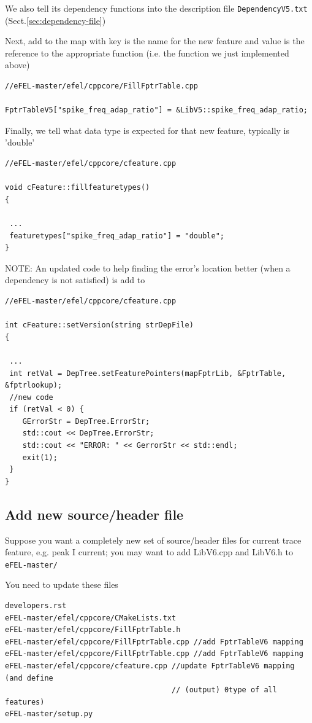 We also tell its dependency functions into the description file
\verb!DependencyV5.txt! (Sect.\ref{sec:dependency-file})

Next, add to the map with key is the name for the new feature and value
is the reference to the appropriate function (i.e. the function we just
implemented above)
\begin{verbatim}
//eFEL-master/efel/cppcore/FillFptrTable.cpp

FptrTableV5["spike_freq_adap_ratio"] = &LibV5::spike_freq_adap_ratio;
\end{verbatim}

Finally, we tell what data type is expected for that new feature, typically is
'double'
\begin{verbatim}
//eFEL-master/efel/cppcore/cfeature.cpp

void cFeature::fillfeaturetypes()
{

 ...
 featuretypes["spike_freq_adap_ratio"] = "double";
}
\end{verbatim}
NOTE: An updated code to help finding the error's location better (when a
dependency is not satisfied) is add to
\begin{verbatim}
//eFEL-master/efel/cppcore/cfeature.cpp

int cFeature::setVersion(string strDepFile)
{
 
 ...
 int retVal = DepTree.setFeaturePointers(mapFptrLib, &FptrTable, &fptrlookup);
 //new code
 if (retVal < 0) {
    GErrorStr = DepTree.ErrorStr;
    std::cout << DepTree.ErrorStr;
    std::cout << "ERROR: " << GerrorStr << std::endl;
    exit(1);
 }
}
\end{verbatim}

\subsection{Add new source/header file}
\label{sec:feature-file}


Suppose you want a completely new set of source/header files for current trace
feature, e.g. peak I current; you may want to add LibV6.cpp and LibV6.h to 
\verb!eFEL-master/!

You need to update these files
{\tiny
\begin{verbatim}
developers.rst
eFEL-master/efel/cppcore/CMakeLists.txt
eFEL-master/efel/cppcore/FillFptrTable.h
eFEL-master/efel/cppcore/FillFptrTable.cpp //add FptrTableV6 mapping
eFEL-master/efel/cppcore/FillFptrTable.cpp //add FptrTableV6 mapping
eFEL-master/efel/cppcore/cfeature.cpp //update FptrTableV6 mapping (and define
                                      // (output) 0type of all features) 
eFEL-master/setup.py
\end{verbatim}
}

